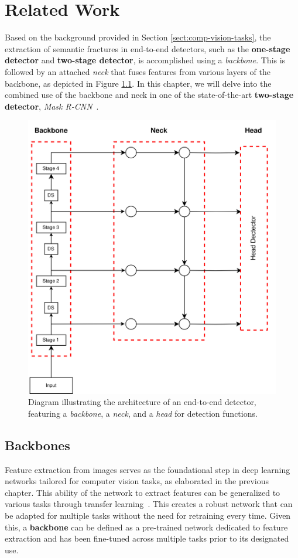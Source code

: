 \chapter{Related Work}
\label{chap:related-work}

Based on the background provided in Section \ref{sect:comp-vision-tasks}, the extraction of semantic fractures in end-to-end detectors, such as the \textbf{one-stage detector} and \textbf{two-stage detector}, is accomplished using a \textit{backbone}. This is followed by an attached \textit{neck} that fuses features from various layers of the backbone, as depicted in Figure \ref{fig:net-backbone-neck-head}.
In this chapter, we will delve into the combined use of the backbone and neck in one of the state-of-the-art \textbf{two-stage detector}, \textit{Mask R-CNN}~\cite{DBLP:journals/corr/HeGDG17}.

\begin{figure}[htb]
    \centering
    \includegraphics[width=0.6\linewidth]{figures/chapters-imgs/30/net-backbone-neck-head.jpg}
    \caption{Diagram illustrating the architecture of an end-to-end detector, featuring a \textit{backbone}, a \textit{neck}, and a \textit{head} for detection functions.}
    \label{fig:net-backbone-neck-head}
\end{figure}

\section{Backbones}
Feature extraction from images serves as the foundational step in deep learning networks tailored for computer vision tasks, as elaborated in the previous chapter. This ability of the network to extract features can be generalized to various tasks through transfer learning~\cite{DBLP:journals/corr/YosinskiCBL14}. This creates a robust network that can be adapted for multiple tasks without the need for retraining every time. Given this, a \textbf{backbone} can be defined as a pre-trained network dedicated to feature extraction and has been fine-tuned across multiple tasks prior to its designated use.

